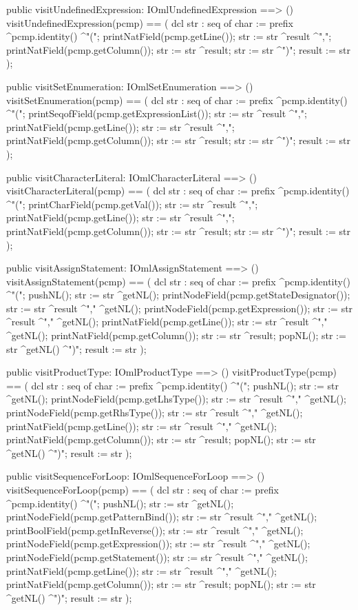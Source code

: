 \begin{vdm_al}
  public visitUndefinedExpression: IOmlUndefinedExpression ==> ()
  visitUndefinedExpression(pcmp) ==
    ( dcl str : seq of char := prefix ^pcmp.identity() ^"(";
      printNatField(pcmp.getLine());
      str := str ^result ^",";
      printNatField(pcmp.getColumn());
      str := str ^result;
      str := str ^")";
      result := str );

  public visitSetEnumeration: IOmlSetEnumeration ==> ()
  visitSetEnumeration(pcmp) ==
    ( dcl str : seq of char := prefix ^pcmp.identity() ^"(";
      printSeqofField(pcmp.getExpressionList());
      str := str ^result ^",";
      printNatField(pcmp.getLine());
      str := str ^result ^",";
      printNatField(pcmp.getColumn());
      str := str ^result;
      str := str ^")";
      result := str );

  public visitCharacterLiteral: IOmlCharacterLiteral ==> ()
  visitCharacterLiteral(pcmp) ==
    ( dcl str : seq of char := prefix ^pcmp.identity() ^"(";
      printCharField(pcmp.getVal());
      str := str ^result ^",";
      printNatField(pcmp.getLine());
      str := str ^result ^",";
      printNatField(pcmp.getColumn());
      str := str ^result;
      str := str ^")";
      result := str );

  public visitAssignStatement: IOmlAssignStatement ==> ()
  visitAssignStatement(pcmp) ==
    ( dcl str : seq of char := prefix ^pcmp.identity() ^"(";
      pushNL();
      str := str ^getNL();
      printNodeField(pcmp.getStateDesignator());
      str := str ^result ^"," ^getNL();
      printNodeField(pcmp.getExpression());
      str := str ^result ^"," ^getNL();
      printNatField(pcmp.getLine());
      str := str ^result ^"," ^getNL();
      printNatField(pcmp.getColumn());
      str := str ^result;
      popNL();
      str := str ^getNL() ^")";
      result := str );

  public visitProductType: IOmlProductType ==> ()
  visitProductType(pcmp) ==
    ( dcl str : seq of char := prefix ^pcmp.identity() ^"(";
      pushNL();
      str := str ^getNL();
      printNodeField(pcmp.getLhsType());
      str := str ^result ^"," ^getNL();
      printNodeField(pcmp.getRhsType());
      str := str ^result ^"," ^getNL();
      printNatField(pcmp.getLine());
      str := str ^result ^"," ^getNL();
      printNatField(pcmp.getColumn());
      str := str ^result;
      popNL();
      str := str ^getNL() ^")";
      result := str );

  public visitSequenceForLoop: IOmlSequenceForLoop ==> ()
  visitSequenceForLoop(pcmp) ==
    ( dcl str : seq of char := prefix ^pcmp.identity() ^"(";
      pushNL();
      str := str ^getNL();
      printNodeField(pcmp.getPatternBind());
      str := str ^result ^"," ^getNL();
      printBoolField(pcmp.getInReverse());
      str := str ^result ^"," ^getNL();
      printNodeField(pcmp.getExpression());
      str := str ^result ^"," ^getNL();
      printNodeField(pcmp.getStatement());
      str := str ^result ^"," ^getNL();
      printNatField(pcmp.getLine());
      str := str ^result ^"," ^getNL();
      printNatField(pcmp.getColumn());
      str := str ^result;
      popNL();
      str := str ^getNL() ^")";
      result := str );


\end{vdm_al}
